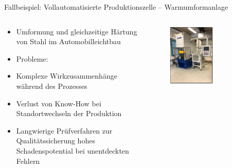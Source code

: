 \documentclass[aspectratio=1610, xcolor=dvipsnames, 9pt]{beamer}
\begin{document}
                    \begin{frame}{Fallbeispiel: Vollautomatisierte Produktionszelle -- Warmumformanlage}
                      \begin{columns}
                        \begin{column}{1\textwidth}
                          \begin{itemize}
                            \item Umformung und gleichzeitige Härtung von Stahl im Automobilleichtbau \newline
                            \item Probleme:
                            \item Komplexe Wirkzusammenhänge während des Prozesses \newline
                            \item Verlust von Know-How bei Standortwechseln der Produktion \newline
                            \item Langwierige Prüfverfahren zur Qualitätssicherung \rightarrow hohes Schadenspotential bei unentdeckten Fehlern \newline
                          \end{itemize}
                        \end{column}
                         \begin{column}{0.4\textwidth}
                           \begin{figure}
                             \centering
                              \includegraphics[width=0.6\textwidth]{images/anlage.png}
                           \end{figure}
                         \end{column}
                      \end{columns}
                        \end{frame}
\end{document}
